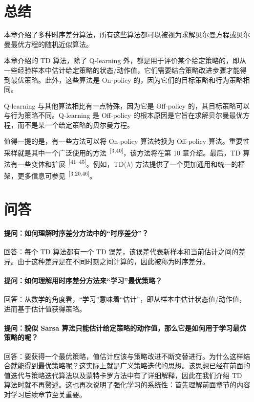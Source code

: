 \section{总结}
\label{sec:rl-td-summary}

本章介绍了多种时序差分算法，所有这些算法都可以被视为求解贝尔曼方程或贝尔曼最优方程的随机近似算法。

本章介绍的 TD 算法，除了 Q-learning 外，都是用于评价某个给定策略的，即从一些经验样本中估计给定策略的状态/动作值，它们需要结合策略改进步骤才能得到最优策略。此外，这些算法是 On-policy 的，因为它们的目标策略和行为策略相同。

Q-learning 与其他算法相比有一点特殊，因为它是 Off-policy 的，其目标策略可以与行为策略不同。Q-learning 是 Off-policy 的根本原因是它旨在求解贝尔曼最优方程，而不是某一个给定策略的贝尔曼方程。

值得一提的是，有一些方法可以将 On-policy 算法转换为 Off-policy 算法。重要性采样就是其中一个广泛使用的方法~\textsuperscript{[3,40]}，该方法将在第 10 章介绍。最后，TD 算法有一些变体和扩展~\textsuperscript{[41--45]}。例如，TD($\lambda$) 方法提供了一个更加通用和统一的框架，更多信息可参见~\textsuperscript{[3,20,46]}。

\section{问答}
\label{sec:rl-td-qa}

\paragraph{提问：如何理解时序差分方法中的“时序差分”？}
回答：每个 TD 算法都有一个 TD 误差，该误差代表新样本和当前估计之间的差异。由于这种差异是在不同时刻之间计算的，因此被称为时序差分。

\paragraph{提问：如何理解用时序差分方法来“学习”最优策略？}
回答：从数学的角度看，“学习”意味着“估计”，即从样本中估计状态值/动作值，进而基于估计值获得策略。

\paragraph{提问：貌似 Sarsa 算法只能估计给定策略的动作值，那么它是如何用于学习最优策略的呢？}
回答：要获得一个最优策略，值估计应该与策略改进不断交替进行。为什么这样结合就能得到最优策略呢？这实际上就是广义策略迭代的思想。该思想已经在前面的值迭代与策略迭代算法以及蒙特卡罗方法中有了详细解释，因此在我们介绍 TD 算法时就不再赘述。这也再次说明了强化学习的系统性：首先理解前面章节的内容对学习后续章节至关重要。

